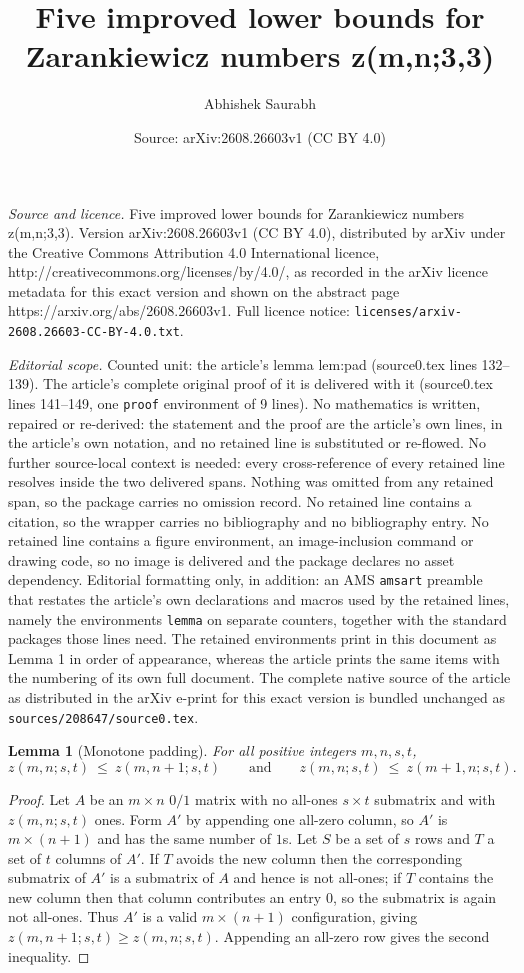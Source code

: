 \documentclass[10pt,a4paper]{amsart}
\title{Five improved lower bounds for Zarankiewicz numbers z(m,n;3,3)}
\author{Abhishek Saurabh}
\date{Source: arXiv:2608.26603v1 (CC BY 4.0)}
\newtheorem{lemma}{Lemma}
\newcommand{\zz}{z}
\begin{document}
\maketitle

\noindent\emph{Source and licence.} Five improved lower bounds for Zarankiewicz numbers z(m,n;3,3). Version arXiv:2608.26603v1 (CC BY 4.0), distributed by arXiv under the Creative Commons Attribution 4.0 International licence, http://creativecommons.org/licenses/by/4.0/, as recorded in the arXiv licence metadata for this exact version and shown on the abstract page https://arxiv.org/abs/2608.26603v1. Full licence notice: \texttt{licenses/arxiv-2608.26603-CC-BY-4.0.txt}.\par\smallskip

\noindent\textit{Editorial scope.} Counted unit: the article's lemma lem:pad (source0.tex lines 132--139). The article's complete original proof of it is delivered with it (source0.tex lines 141--149, one \texttt{proof} environment of 9 lines). No mathematics is written, repaired or re-derived: the statement and the proof are the article's own lines, in the article's own notation, and no retained line is substituted or re-flowed.  No further source-local context is needed: every cross-reference of every retained line resolves inside the two delivered spans.  Nothing was omitted from any retained span, so the package carries no omission record.  No retained line contains a citation, so the wrapper carries no bibliography and no bibliography entry.  No retained line contains a figure environment, an image-inclusion command or drawing code, so no image is delivered and the package declares no asset dependency.  Editorial formatting only, in addition: an AMS \texttt{amsart} preamble that restates the article's own declarations and macros used by the retained lines, namely the environments \texttt{lemma} on separate counters, together with the standard packages those lines need.  The retained environments print in this document as Lemma 1 in order of appearance, whereas the article prints the same items with the numbering of its own full document.  The complete native source of the article as distributed in the arXiv e-print for this exact version is bundled unchanged as \texttt{sources/208647/source0.tex}.
\begin{lemma}[Monotone padding]\label{lem:pad}
For all positive integers $m,n,s,t$,
\[
  \zz(m,n;s,t)\ \le\ \zz(m,n+1;s,t)
  \qquad\text{and}\qquad
  \zz(m,n;s,t)\ \le\ \zz(m+1,n;s,t).
\]
\end{lemma}

\begin{proof}
Let $A$ be an $m\times n$ $0/1$ matrix with no all-ones $s\times t$ submatrix and with
$\zz(m,n;s,t)$ ones. Form $A'$ by appending one all-zero column, so $A'$ is $m\times(n+1)$ and has
the same number of $1$s. Let $S$ be a set of $s$ rows and $T$ a set of $t$ columns of $A'$. If $T$
avoids the new column then the corresponding submatrix of $A'$ is a submatrix of $A$ and hence is not
all-ones; if $T$ contains the new column then that column contributes an entry $0$, so the submatrix
is again not all-ones. Thus $A'$ is a valid $m\times(n+1)$ configuration, giving
$\zz(m,n+1;s,t)\ge\zz(m,n;s,t)$. Appending an all-zero row gives the second inequality.
\end{proof}
\end{document}
